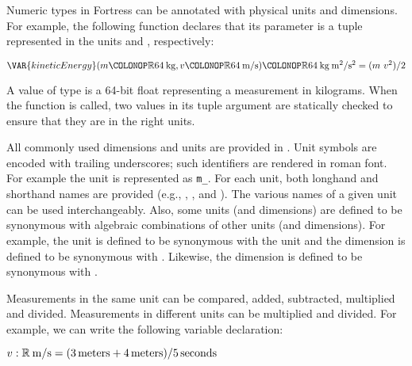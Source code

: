 Numeric types in Fortress can be annotated with physical units and
dimensions. For example, the following function declares that its
parameter is a tuple represented in the units  and
,
respectively:

\begin{Fortress}
\(\VAR{kineticEnergy}(m\COLONOP\mathbb{R}64\mskip 4mu plus 4mu\mathrm{kg}, v\COLONOP\mathbb{R}64\mskip 4mu plus 4mu\mathrm{m}/\mathrm{s})\COLONOP\mathbb{R}64\mskip 4mu plus 4mu\mathrm{kg}\mskip 4mu plus 4mu\mathrm{m}^{2}/\mathrm{s}^{2} = (m\ v^{2}) / 2\)
\end{Fortress}

A value of type  is a
64-bit float representing a measurement in kilograms.
When the function  is called, two values in its tuple
argument are statically checked to ensure that they are in the right units.

All commonly used dimensions and units are provided in \library.
Unit symbols are encoded with trailing underscores;
such identifiers are rendered in roman font.
For example the unit  is represented as \verb$m_$.
For each unit, both longhand and shorthand names are provided
(e.g., ,
, and ).
The various names of a given unit can be used interchangeably.
Also, some units (and dimensions) are defined to be synonymous
with algebraic combinations of other units (and dimensions).
For example, the unit  is defined to be synonymous
with the unit 
and the dimension  is defined to be synonymous with
.
Likewise, the dimension 
is defined to be synonymous with .

Measurements in the same unit can be compared, added, subtracted,
multiplied and divided.
Measurements in different units can be multiplied and divided.
For example, we can write the following variable declaration:

\begin{Fortress}
\(v \mathrel{\mathtt{:}} \mathbb{R}\mskip 4mu plus 4mu\mathrm{m}/\mathrm{s} = (3\,\mathrm{meters} + 4\,\mathrm{meters}) / 5\,\mathrm{seconds}\)
\end{Fortress}

